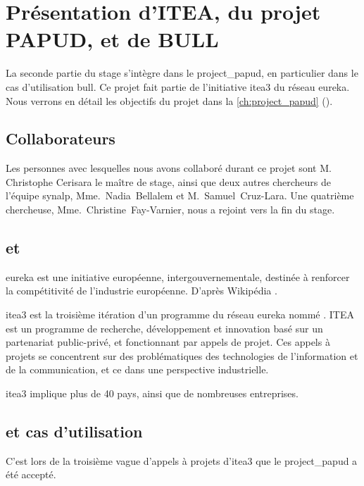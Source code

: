 \chapter{Présentation d'ITEA, du projet PAPUD, et de BULL}
La seconde partie du stage s'intègre dans le \gls{project_papud}, en particulier dans le cas d'utilisation \gls{bull}. Ce projet fait partie de l'initiative \gls{itea3} du réseau \gls{eureka}.
%
Nous verrons en détail les objectifs du projet dans la \autoref{ch:project_papud} ().


\section{Collaborateurs}\label{sec:papud_colabo}
Les personnes avec lesquelles nous avons collaboré durant ce projet sont M. Christophe Cerisara le maître de stage, ainsi que deux autres chercheurs de l'équipe \gls{synalp}, \mbox{Mme.~Nadia~Bellalem} et \mbox{M.~Samuel~Cruz-Lara}.
Une quatrième chercheuse, \mbox{Mme.~Christine~Fay-Varnier}, nous a rejoint vers la fin du stage.

\section{ et }
\og\gls{eureka} est une initiative européenne, intergouvernementale, destinée à renforcer la compétitivité de l’industrie européenne.\fg{} D'après Wikipédia \autocite{wiki_eureka}.

\gls{itea3} est la troisième itération d'un programme du réseau \gls{eureka} nommé .
ITEA est un programme de recherche, développement et innovation basé sur un partenariat public-privé, et fonctionnant par appels de projet.
Ces appels à projets se concentrent sur des problématiques des technologies de l'information et de la communication, et ce dans une perspective industrielle.

\gls{itea3} implique plus de 40 pays, ainsi que de nombreuses entreprises.

\pagebreak
\section{ et cas d'utilisation }
C'est lors de la troisième vague d'appels à projets d'\gls{itea3} que le  \gls{project_papud} a été accepté.

